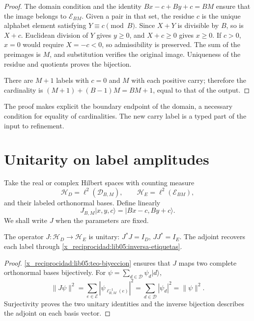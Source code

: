 \begin{proof}
The domain condition and the identity
\(Bx-c+By+c=BM\) ensure that the image belongs to
\(\mathcal E_{BM}\). Given a pair in that set, the residue
\(c\) is the unique alphabet element satisfying
\(Y\equiv c\pmod B\). Since \(X+Y\) is divisible by \(B\),
so is \(X+c\). Euclidean division of \(Y\) gives
\(y\geq0\), and \(X+c\geq0\) gives \(x\geq0\). If \(c>0\),
\(x=0\) would require \(X=-c<0\), so admissibility is
preserved. The sum of the preimages is \(M\), and
substitution verifies the original image. Uniqueness of the residue and
quotients proves the bijection.

There are \(M+1\) labels with \(c=0\) and \(M\) with each positive
carry; therefore the cardinality is
\((M+1)+(B-1)M=BM+1\), equal to that of the output.
\end{proof}

The proof makes explicit the boundary endpoint of the domain, a necessary
condition for equality of cardinalities. The new carry label
is a typed part of the input to refinement.

\section{Unitarity on label amplitudes}
\label{x_reciprocidad:lib05:unitariedad}

Take the real or complex Hilbert spaces with counting measure
\begin{equation}
 \mathscr H_D=\ell^2(\mathcal D_{B,M}),\qquad
 \mathscr H_E=\ell^2(\mathcal E_{BM}),
 \label{x_reciprocidad:lib05:hilbert}
\end{equation}
and their labeled orthonormal bases. Define linearly
\begin{equation}
 J_{B,M}|x,y,c\rangle=|Bx-c,By+c\rangle.
 \label{x_reciprocidad:lib05:j}
\end{equation}
We shall write \(J\) when the parameters are fixed.

\begin{proposition}
\label{x_reciprocidad:lib05:prop-unitaria}
The operator \(J:\mathscr H_D\to\mathscr H_E\) is unitary:
\(J^*J=I_D\), \(JJ^*=I_E\). The adjoint recovers each label
through \eqref{x_reciprocidad:lib05:inversa-etiquetas}.
\end{proposition}

\begin{proof}
\cref{x_reciprocidad:lib05:teo-biyeccion} ensures that \(J\) maps
two complete orthonormal bases bijectively. For
\(\psi=\sum_{d\in\mathcal D}\psi_d|d\rangle\),
\[
 \|J\psi\|^2
 =\sum_{e\in\mathcal E}|\psi_{\ell_{B,M}^{-1}(e)}|^2
 =\sum_{d\in\mathcal D}|\psi_d|^2=\|\psi\|^2.
\]
Surjectivity proves the two unitary identities and the
inverse bijection describes the adjoint on each basis vector.
\end{proof}

